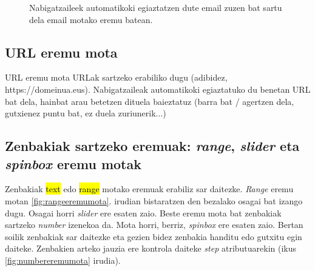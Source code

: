  \begin{figure}[ht]
	\centering
{}
\caption{Nabigatzaileek automatikoki egiaztatzen dute email zuzen bat sartu dela email motako eremu batean.}
\label{fig:emailmota}
\end{figure}

\subsection{URL eremu mota}

URL eremu mota URLak sartzeko erabiliko dugu (adibidez, https://domeinua.eus).
Nabigatzaileak automatikoki egiaztatuko du benetan URL bat dela, hainbat arau betetzen dituela baieztatuz (barra bat / agertzen dela, gutxienez puntu bat, ez duela zuriunerik...)


\subsection{Zenbakiak sartzeko eremuak: \textit{range}, \textit{slider} eta \textit{spinbox} eremu motak}

Zenbakiak \hl{text} edo \hl{range} motako eremuak erabiliz sar daitezke. \textit{Range} eremu motan \ref{fig:rangeeremumota}. irudian bistaratzen den bezalako osagai bat izango dugu. Osagai horri  \textit{slider} ere esaten zaio. Beste eremu mota bat zenbakiak sartzeko \textit{number}  izenekoa da. Mota horri, berriz, \textit{spinbox} ere esaten zaio. Bertan soilik zenbakiak sar daitezke eta gezien bidez zenbakia handitu edo gutxitu egin daiteke. Zenbakien arteko jauzia ere kontrola daiteke \textit{step} atributuarekin (ikus \ref{fig:numbereremumota} irudia).


